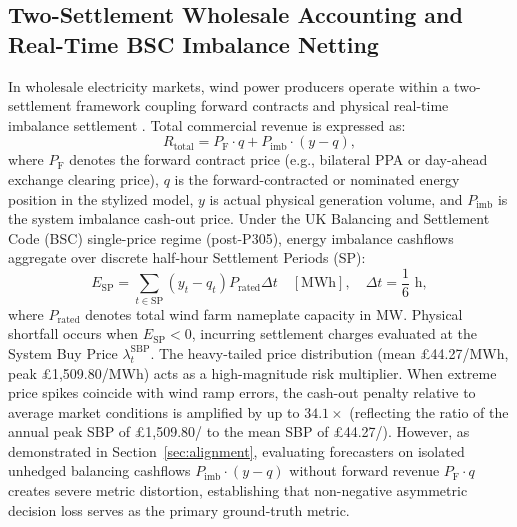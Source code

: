 \subsection{Two-Settlement Wholesale Accounting and Real-Time BSC Imbalance Netting}
In wholesale electricity markets, wind power producers operate within a two-settlement framework coupling forward contracts and physical real-time imbalance settlement \cite{morales2014,pinson2007trading}. Total commercial revenue is expressed as:
\begin{equation}
R_{\text{total}} = P_{\text{F}} \cdot q + P_{\text{imb}} \cdot (y - q),
\label{eq:two_settlement}
\end{equation}
where $P_{\text{F}}$ denotes the forward contract price (e.g., bilateral PPA or day-ahead exchange clearing price), $q$ is the forward-contracted or nominated energy position in the stylized model, $y$ is actual physical generation volume, and $P_{\text{imb}}$ is the system imbalance cash-out price. Under the UK Balancing and Settlement Code (BSC) single-price regime (post-P305), energy imbalance cashflows aggregate over discrete half-hour Settlement Periods (SP):
\begin{equation}
E_{\text{SP}} = \sum_{t \in \text{SP}} (y_t - q_t) P_{\text{rated}} \Delta t \quad [\text{MWh}], \quad \Delta t = \frac{1}{6}\text{ h},
\label{eq:bsc_netting}
\end{equation}
where $P_{\text{rated}}$ denotes total wind farm nameplate capacity in MW. Physical shortfall occurs when $E_{\text{SP}} < 0$, incurring settlement charges evaluated at the System Buy Price $\lambda_t^{\text{SBP}}$. The heavy-tailed price distribution (mean \pounds 44.27/MWh, peak \pounds 1,509.80/MWh) acts as a high-magnitude risk multiplier. When extreme price spikes coincide with wind ramp errors, the cash-out penalty relative to average market conditions is amplified by up to $34.1\times$ (reflecting the ratio of the annual peak SBP of \pounds 1{,}509.80/ to the mean SBP of \pounds 44.27/). However, as demonstrated in Section~\ref{sec:alignment}, evaluating forecasters on isolated unhedged balancing cashflows $P_{\text{imb}} \cdot (y - q)$ without forward revenue $P_{\text{F}} \cdot q$ creates severe metric distortion, establishing that non-negative asymmetric decision loss serves as the primary ground-truth metric.
